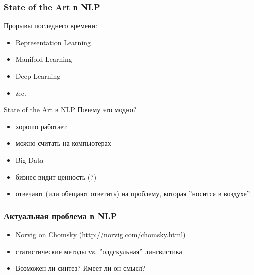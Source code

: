 \documentclass{beamer}
\begin{document}
\begin{frame}[fragile]
\frametitle{State of the Art в NLP}
Прорывы последнего времени:\bigskip
\begin{itemize}
  \item Representation Learning
  \item Manifold Learning
  \item Deep Learning
  \item \&c.
\end{itemize}
\end{frame}

\begin{frame}{State of the Art в NLP}
Почему это модно?\bigskip
\begin{itemize}
  \item хорошо работает
  \item можно считать на компьютерах
  \item Big Data
  \item бизнес видит ценность (?) 
  \item отвечают (или обещают ответить) на проблему, которая ''носится в воздухе'' 
\end{itemize}
\end{frame}

\begin{frame}[fragile]
\frametitle{Актуальная проблема в NLP}
\begin{itemize}
  \item Norvig on Chomsky (http://norvig.com/chomsky.html) 
  \item статистические методы vs. ''олдскульная'' лингвистика 
  \item Возможен ли синтез? Имеет ли он смысл?
\end{itemize}
\end{frame}
\end{document}
